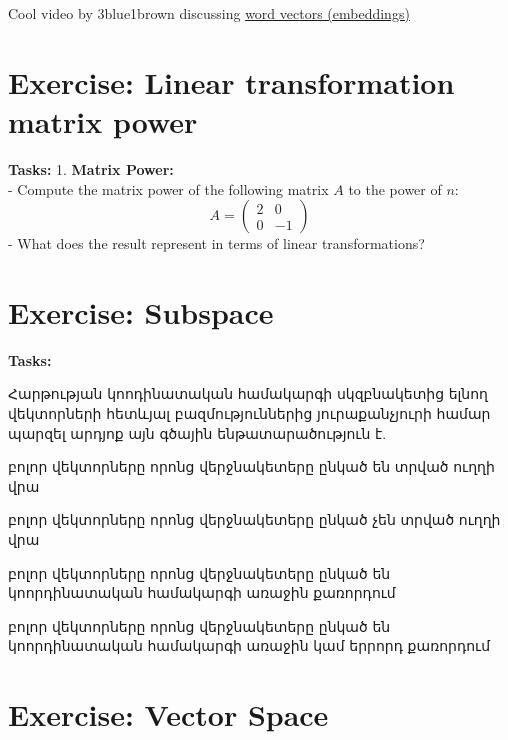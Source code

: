 \documentclass[
  letterpaper,
  DIV=11,
  numbers=noendperiod]{scrreprt}
\begin{document}
\begin{tcolorbox}[enhanced jigsaw, toptitle=1mm, titlerule=0mm, toprule=.15mm, bottomtitle=1mm, opacityback=0, opacitybacktitle=0.6, bottomrule=.15mm, title=\textcolor{quarto-callout-note-color}{\faInfo}\hspace{0.5em}{Note}, leftrule=.75mm, arc=.35mm, colbacktitle=quarto-callout-note-color!10!white, rightrule=.15mm, left=2mm, colback=white, colframe=quarto-callout-note-color-frame, breakable, coltitle=black]

Cool video by 3blue1brown discussing
\href{https://youtu.be/wjZofJX0v4M?t=751}{word vectors (embeddings)}

\end{tcolorbox}

\section{Exercise: Linear transformation matrix
power}\label{exercise-linear-transformation-matrix-power}

\textbf{Tasks:} 1. \textbf{Matrix Power:}\\
- Compute the matrix power of the following matrix \(A\) to the power of
\(n\): \[
A = \begin{pmatrix}
    2 & 0 \\
    0 & -1
\end{pmatrix}
\] - What does the result represent in terms of linear transformations?

\section{Exercise: Subspace}\label{exercise-subspace}

\textbf{Tasks:}

Հարթության կոոդինատական համակարգի սկզբնակետից ելնող վեկտորների հետևյալ
բազմություններից յուրաքանչյուրի համար պարզել արդյոք այն գծային
ենթատարածություն է. \n

բոլոր վեկտորները որոնց վերջնակետերը ընկած են տրված ուղղի վրա

բոլոր վեկտորները որոնց վերջնակետերը ընկած չեն տրված ուղղի վրա

բոլոր վեկտորները որոնց վերջնակետերը ընկած են կոորդինատական համակարգի
առաջին քառորդում

բոլոր վեկտորները որոնց վերջնակետերը ընկած են կոորդինատական համակարգի
առաջին կամ երրորդ քառորդում

\section{Exercise: Vector Space}\label{exercise-vector-space}
\end{document}
